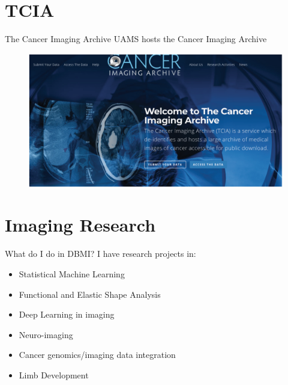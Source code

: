 \documentclass[11pt, aspectratio=43]{beamer}
\begin{document}
\section{TCIA}	

\begin{frame}{The Cancer Imaging Archive}
	UAMS hosts the Cancer Imaging Archive
	\begin{figure}[h]
		\centering
		\includegraphics[scale=0.45]{Figures/TCIA.png}
	\end{figure}
	
\end{frame}


\section{Imaging Research}
	

	
	\begin{frame}{What do I do in DBMI?}
		I have research projects in:
		\begin{itemize}
			\item Statistical Machine Learning
			\item Functional and Elastic Shape Analysis
			\item Deep Learning in imaging
			\item Neuro-imaging			
			\item Cancer genomics/imaging data integration
			\item Limb Development
		\end{itemize}
		
	\end{frame}
\end{document}
